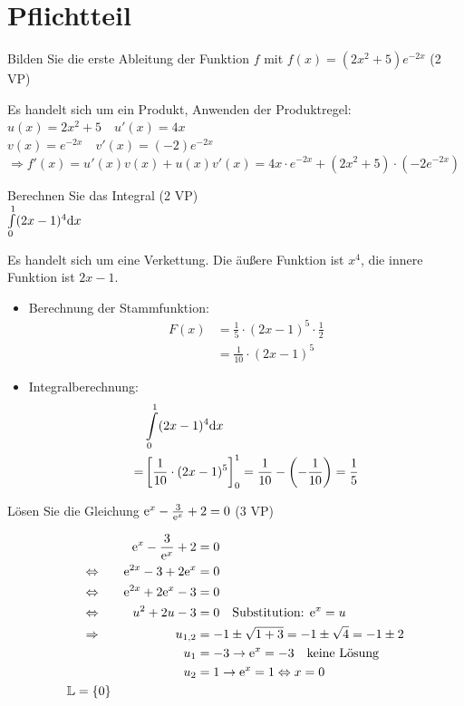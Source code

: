 

\newcommand{\pts}[1]{\hfill (#1 VP)}


\section{Pflichtteil}
\aufgabe{} Bilden Sie die erste Ableitung der Funktion $f$ mit $f(x) = (2x^2+5)e^{-2x}$ \pts{2}
\begin{lsg}{}
Es handelt sich um ein Produkt, Anwenden der Produktregel:\\
$u(x) = 2x^2+5 \quad u'(x)=4x$\\
$v(x) = e^{-2x} \quad v'(x)=(-2)e^{-2x}$\\
$\Rightarrow f'(x)=u'(x)v(x)+u(x)v'(x) = 4x\cdot e^{-2x}+(2x^2+5)\cdot(-2e^{-2x})$
\end{lsg}

\aufgabe{} Berechnen Sie das Integral \pts{2}\\
$\int\limits_0^1(2x-1)^4 \mathrm{d} x$
\begin{lsg}{}
Es handelt sich um eine Verkettung.
Die äußere Funktion ist $x^4$, die innere Funktion ist $2x-1$.\\
\begin{itemize}
  \item  Berechnung der Stammfunktion:
  \begin{align*}
    F(x) &= \frac 1 5 \cdot(2x-1)^5\cdot\frac 1 2\\
    &=\frac{1}{10}\cdot(2x-1)^5
  \end{align*}
  \item Integralberechnung:
  \begin{align*}
    &\int\limits_0^1(2x-1)^4 \mathrm{d} x\\
    =&\left[\frac{1}{10}\cdot(2x-1)^5\right]^1_0 = \frac{1}{10}-\left(-\frac{1}{10}\right) = \frac 1 5
  \end{align*}
\end{itemize}
\end{lsg}

\aufgabe{}Lösen Sie die Gleichung $\mathrm{e}^x-\frac{3}{\mathrm{e}^x}+2=0$ \pts{3}\\
\begin{lsg}{}
\begin{alignat*}{2}
    &&\mathrm{e}^x-\frac{3}{\mathrm{e}^x}+2 &= 0\\
    \Leftrightarrow\quad && \mathrm{e}^{2x}-3+2\mathrm{e}^x &= 0\\
    \Leftrightarrow\quad && \mathrm{e}^{2x}+2\mathrm{e}^x-3 &= 0\\
    \Leftrightarrow\quad && u^2+2u-3 &= 0 \quad\text{Substitution: }\mathrm{e}^x=u\\
    \Rightarrow\quad && u_{1,2} &= -1\pm\sqrt{1+3}=-1\pm\sqrt{4}=-1\pm2\\
    && u_1 &= -3 \rightarrow \mathrm{e}^x = -3 \quad\text{keine Lösung}\\
    && u_2 &= 1 \rightarrow \mathrm{e}^x = 1 \Leftrightarrow x=0\\
    \mathbb{L} = \{0\}
\end{alignat*}
\end{lsg}

